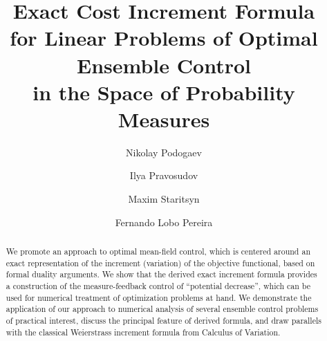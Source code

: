 \documentclass[12pt]{llncs}
\begin{document}
%
\fi

\title{Exact Cost Increment Formula \\ for Linear Problems of Optimal Ensemble Control \\ in the Space of Probability Measures}
\author{
Nikolay Podogaev
  \and
Ilya Pravosudov
  \and
Maxim Staritsyn
  \and
Fernando Lobo Pereira
}


\maketitle

\begin{abstract}
We promote an approach to optimal mean-field control, which is centered around an exact representation of the increment (variation) of the objective functional, based on formal duality arguments. %
We show that the derived exact increment formula provides a construction of the measure-feedback control of ``potential decrease'', which can be used for numerical treatment of optimization problems at hand. We demonstrate the application of our approach to numerical analysis of several ensemble control problems of practical interest, discuss the principal feature of derived formula, and draw parallels with the classical Weierstrass increment formula from Calculus of Variation. %

\end{abstract}
\end{document}
